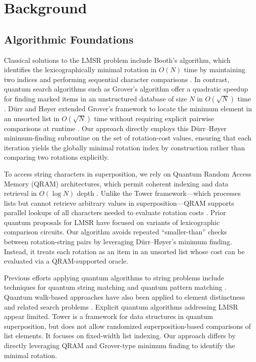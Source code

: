 \documentclass[11pt,letterpaper]{article}
\begin{document}
\section{Background}
\label{sec:background}
\subsection{Algorithmic Foundations}

Classical solutions to the LMSR problem include Booth's algorithm, which identifies the lexicographically minimal rotation in \(O(N)\) time by maintaining two indices and performing sequential character comparisons \cite{booth1980lexicographically}. In contrast, quantum search algorithms such as Grover's algorithm offer a quadratic speedup for finding marked items in an unstructured database of size \(N\) in \(O(\sqrt{N})\) time \cite{grover1996fast,boyer1998tight}. D{\"u}rr and H{\o}yer extended Grover's framework to locate the minimum element in an unsorted list in \(O(\sqrt{N})\) time without requiring explicit pairwise comparisons at runtime \cite{durr1996quantum}. Our approach directly employs this D{\"u}rr--H{\o}yer minimum-finding subroutine on the set of rotation-cost values, ensuring that each iteration yields the globally minimal rotation index by construction rather than comparing two rotations explicitly.

To access string characters in superposition, we rely on Quantum Random Access Memory (QRAM) architectures, which permit coherent indexing and data retrieval in \(O(\log N)\) depth \cite{giovannetti2008quantum,giovannetti2008architectures,dimatteo2020fault}. Unlike the Tower framework---which processes lists but cannot retrieve arbitrary values in superposition---QRAM supports parallel lookups of all characters needed to evaluate rotation costs \cite{yuan2022tower}. Prior quantum proposals for LMSR have focused on variants of lexicographic comparison circuits. Our algorithm avoids repeated ``smaller-than'' checks between rotation-string pairs by leveraging D{\"u}rr--H{\o}yer's minimum finding. Instead, it treats each rotation as an item in an unsorted list whose cost can be evaluated via a QRAM-supported oracle.

Previous efforts applying quantum algorithms to string problems include techniques for quantum string matching \cite{ramesh2003string} and quantum pattern matching \cite{montanaro2017pattern}. Quantum walk-based approaches have also been applied to element distinctness and related search problems \cite{ambainis2007quantum}. Explicit quantum algorithms addressing LMSR appear limited. Tower \cite{yuan2022tower} is a framework for data structures in quantum superposition, but does not allow randomized superposition-based comparisons of list elements. It focuses on fixed-width list indexing. Our approach differs by directly leveraging QRAM and Grover-type minimum finding to identify the minimal rotation.
\end{document}
